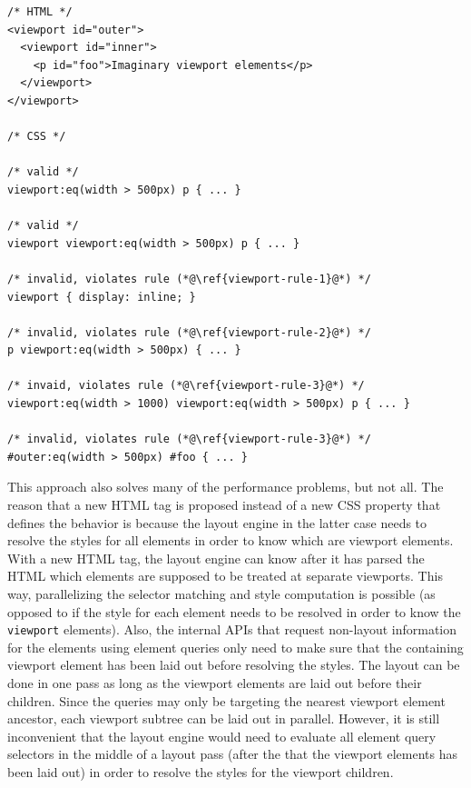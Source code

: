 \documentclass[a4paper,11pt]{kth-mag}
\newcommand{\code}[1]{\texttt{#1}}
\begin{document}
          \begin{lstlisting}[caption={Examples of valid and invalid selectors with the imaginary \code{viewport} element.}, captionpos=b, label={code:viewport-selectors}]
/* HTML */
<viewport id="outer">
  <viewport id="inner">
    <p id="foo">Imaginary viewport elements</p>
  </viewport>
</viewport>

/* CSS */

/* valid */
viewport:eq(width > 500px) p { ... }

/* valid */
viewport viewport:eq(width > 500px) p { ... }

/* invalid, violates rule (*@\ref{viewport-rule-1}@*) */
viewport { display: inline; }

/* invalid, violates rule (*@\ref{viewport-rule-2}@*) */
p viewport:eq(width > 500px) { ... }

/* invaid, violates rule (*@\ref{viewport-rule-3}@*) */
viewport:eq(width > 1000) viewport:eq(width > 500px) p { ... }

/* invalid, violates rule (*@\ref{viewport-rule-3}@*) */
#outer:eq(width > 500px) #foo { ... }
          \end{lstlisting}
          
          This approach also solves many of the performance problems, but not all.
          The reason that a new \gls{HTML} tag is proposed instead of a new \gls{CSS} property that defines the behavior is because the \gls{layout engine} in the latter case needs to resolve the styles for all \glspl{element} in order to know which are \gls{viewport} \glspl{element}.
          With a new \gls{HTML} tag, the \gls{layout engine} can know after it has parsed the \gls{HTML} which \glspl{element} are supposed to be treated at separate viewports.
          This way, parallelizing the selector matching and style computation is possible (as opposed to if the style for each element needs to be resolved in order to know the \code{viewport} \glspl{element}).
          Also, the internal \glspl{API} that request non-layout information for the \glspl{element} using element queries only need to make sure that the containing \gls{viewport} \gls{element} has been laid out before resolving the styles.
          The layout can be done in one pass as long as the \gls{viewport} \glspl{element} are laid out before their children.
          Since the queries may only be targeting the nearest \gls{viewport} \gls{element} ancestor, each \gls{viewport} subtree can be laid out in parallel.
          However, it is still inconvenient that the \gls{layout engine} would need to evaluate all element query selectors in the middle of a layout pass (after the that the \gls{viewport} \glspl{element} has been laid out) in order to resolve the styles for the \gls{viewport} children.
\end{document}
